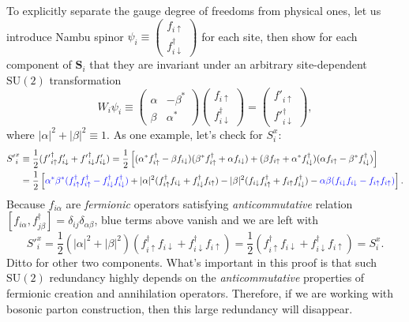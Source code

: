 \documentclass[10pt,nofootinbib]{revtex4}
\begin{document}
	To explicitly separate the gauge degree of freedoms from physical ones, let us introduce Nambu spinor $\psi_i\equiv\left(\begin{array}{c}
			f_{i\uparrow}\\f_{i\downarrow}^\dagger
		\end{array}\right)$ for each site,	then show for each component of $\bm{S}_i$ that they are invariant under an arbitrary site-dependent $\mathrm{SU}(2)$ transformation
	\begin{equation*}
		W_i\psi_i\equiv\left(\begin{array}{cc}
			\alpha & -\beta^*\\ \beta & \alpha^*
		\end{array}\right)\left(\begin{array}{c}
			f_{i\uparrow}\\ f_{i\downarrow}^\dagger
		\end{array}\right)=\left(\begin{array}{c}
			f'_{i\uparrow}\\ {f'}_{i\downarrow}^\dagger
		\end{array}\right),
	\end{equation*}
	where $|\alpha|^2+|\beta|^2\equiv1$. As one example, let's check for $S_i^x$:
	\begin{align*}
		{S'}_i^x&\equiv\dfrac12({f'}_{i\uparrow}^\dagger f'_{i\downarrow}+{f'}_{i\downarrow}^\dagger f'_{i\downarrow})=\dfrac12\left[(\alpha^* f_{i\uparrow}^\dagger-\beta f_{i\downarrow})(\beta^* f_{i\uparrow}^\dagger+\alpha f_{i \downarrow})+(\beta f_{i\uparrow}+\alpha^* f_{i\downarrow}^\dagger)(\alpha f_{i\uparrow}-\beta^*f_{i\downarrow}^\dagger)\right]\\
		&=\dfrac12\left[{\color{blue}\alpha^* \beta^*(f_{i\uparrow}^\dagger f_{i\uparrow}^\dagger-f_{i\downarrow}^\dagger f_{i\downarrow}^\dagger)}+|\alpha|^2(f_{i\uparrow}^\dagger f_{i\downarrow}+f_{i\downarrow}^\dagger f_{i\uparrow})-|\beta|^2(f_{i\downarrow}f_{i\uparrow}^\dagger+f_{i\uparrow}f_{i\downarrow}^\dagger)-{\color{blue}\alpha \beta(f_{i\downarrow}f_{i\downarrow}-f_{i\uparrow}f_{i\uparrow})}\right].
	\end{align*}
	Because $f_{i \alpha}$ are \emph{fermionic} operators satisfying \emph{anticommutative} relation $[f_{i \alpha}, f_{j \beta}^\dagger]=\delta_{ij}\delta_{\alpha \beta}$, blue terms above vanish and we are left with
	\begin{equation*}
		{S'}_i^x=\dfrac{1}{2}(|\alpha|^2+|\beta|^2)(f_{i\uparrow}^\dagger f_{i\downarrow}+f_{i\downarrow}^\dagger f_{i\uparrow})=\dfrac12(f_{i\uparrow}^\dagger f_{i\downarrow}+f_{i\downarrow}^\dagger f_{i\uparrow})=S_i^x.
	\end{equation*}
	Ditto for other two components. What's important in this proof is that such $\mathrm{SU}(2)$ redundancy highly depends on the \emph{anticommutative} properties of fermionic creation and annihilation operators. Therefore, if we are working with bosonic parton construction, then this large redundancy will disappear.
\end{document}
